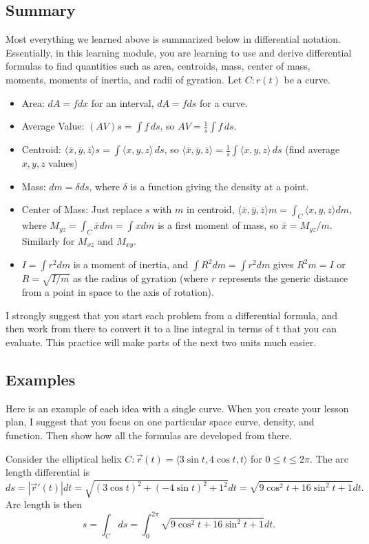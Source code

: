 \subsection{Summary}
Most everything we learned above is summarized below in differential
notation.  Essentially, in this learning module, you are learning to
use and derive differential formulas to find quantities such as area,
centroids, mass, center of mass, moments, moments of
inertia, and radii of gyration.  Let $C\colon r(t)$ be a curve.
\begin{itemize}
\item Area: $dA = fdx$ for an interval, $dA=fds $ for a curve.
\item Average Value: $(AV) s = \int f \,ds$, so $AV=\frac 1 s \int f\,ds$.
\item Centroid: $\langle\bar x,\bar y,\bar z\rangle s =\int
\langle x,y,z\rangle\, ds$, so $\langle\bar x,\bar y,\bar z\rangle= \frac 1 s \int \langle x,y,z\rangle\,ds$ (find average $x,y,z$ values)
\item Mass: $dm = \delta ds $, where $\delta$ is a function giving the density at a point.
\item Center of Mass: Just replace $s$ with $m$ in centroid,
$\langle\bar x,\bar y,\bar z\rangle m = \int_C \langle x,y,z\rangle dm$,
where $M_{yz}=\int_C \bar x dm = \int x dm$ is a first moment of mass, so $\bar x = M_{yz}/m$.  Similarly for $M_{xz}$ and $M_{xy}$.
\item $I = \int r^2 dm$ is a moment of inertia, and $\int R^2 dm = \int r^2 dm$
gives $R^2 m =I$ or $R=\sqrt{I/m}$ as the radius of gyration (where
$r$ represents the generic distance from a point in space to the axis
of rotation).
\end{itemize}
I strongly suggest that you start each problem from a differential
formula, and then work from there to convert it to a line integral in
terms of t that you can evaluate.  This practice will make parts of
the next two units much easier.


\subsection{Examples}
Here is an example of each idea with a single curve. When you create
your lesson plan, I suggest that you focus on one particular space
curve, density, and function.  Then show how all the formulas are
developed from there.

Consider the elliptical helix $C\colon\vec r (t) = \langle3\sin t, 4\cos t,
t\rangle$ for $0\leq t\leq 2\pi$.  The arc length differential is $$ds = |\vec
r'(t)|dt = \sqrt{(3\cos t)^2 + (-4\sin t)^2+1^2}dt = \sqrt{9\cos^2
t+16\sin^2 t+1}dt.$$ Arc length is then  $$s=\int_C ds =
\int_{0}^{2\pi}\sqrt{9\cos^2 t+16\sin^2 t+1}dt.$$

